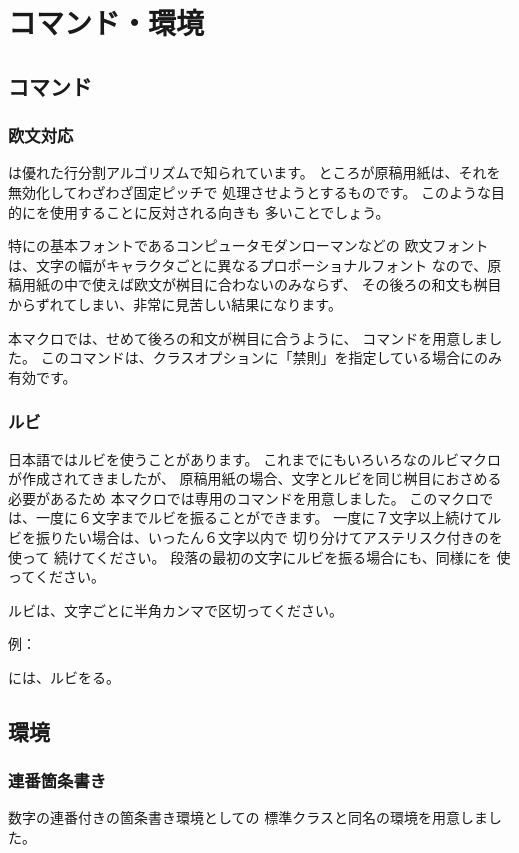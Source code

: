 \documentclass[横,B5,禁則,名前]{genkou}
\begin{document}
\chapter{コマンド・環境}
\section{コマンド}
\subsection{欧文対応}
\oubun{\TeX}は優れた行分割アルゴリズムで知られています。
ところが原稿用紙は、それを無効化してわざわざ固定ピッチで
処理させようとするものです。
このような目的に\oubun{\TeX}を使用することに反対される向きも
多いことでしょう。

特に\oubun{\TeX}の基本フォントであるコンピュータモダンローマンなどの
欧文フォントは、文字の幅がキャラクタごとに異なるプロポーショナルフォント
なので、原稿用紙の中で使えば欧文が桝目に合わないのみならず、
その後ろの和文も桝目からずれてしまい、非常に見苦しい結果になります。

本マクロでは、せめて後ろの和文が桝目に合うように、
コマンドを用意しました。
このコマンドは、クラスオプションに「禁則」を指定している場合にのみ
有効です。

\subsection{ルビ}
日本語ではルビを使うことがあります。
これまでにもいろいろな\oubun{\TeX}のルビマクロが作成されてきましたが、
原稿用紙の場合、文字とルビを同じ桝目におさめる必要があるため
本マクロでは専用のコマンドを用意しました。
このマクロでは、一度に６文字までルビを振ることができます。
一度に７文字以上続けてルビを振りたい場合は、いったん６文字以内で
切り分けてアステリスク付きのを使って
続けてください。
段落の最初の文字にルビを振る場合にも、同様にを
使ってください。

ルビは、文字ごとに半角カンマで区切ってください。

例：\par
{}には、ルビをる。

\section{環境}
\subsection{連番箇条書き}
数字の連番付きの箇条書き環境として\oubun{\LaTeX}の
標準クラスと同名の環境を用意しました。
\end{document}
